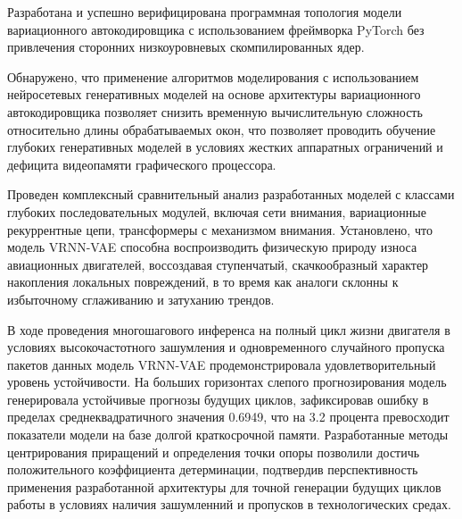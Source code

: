 \documentclass[14pt, a4paper, oneside]{extreport}
\begin{document}
Разработана и успешно верифицирована программная топология модели вариационного автокодировщика с использованием фреймворка PyTorch без привлечения сторонних низкоуровневых скомпилированных ядер. 

Обнаружено, что применение алгоритмов моделирования с использованием нейросетевых генеративных моделей на основе архитектуры вариационного автокодировщика позволяет снизить временную вычислительную сложность относительно длины обрабатываемых окон, что позволяет проводить обучение глубоких генеративных моделей в условиях жестких аппаратных ограничений и дефицита видеопамяти графического процессора.

Проведен комплексный сравнительный анализ разработанных моделей с классами глубоких последовательных модулей, включая сети внимания, вариационные рекуррентные цепи, трансформеры с механизмом внимания. Установлено, что модель VRNN-VAE способна воспроизводить физическую природу износа авиационных двигателей, воссоздавая ступенчатый, скачкообразный характер накопления локальных повреждений, в то время как аналоги склонны к избыточному сглаживанию и затуханию трендов.

В ходе проведения многошагового инференса на полный цикл жизни двигателя в условиях высокочастотного зашумления и одновременного случайного пропуска пакетов данных модель VRNN-VAE продемонстрировала удовлетворительный уровень устойчивости. На больших горизонтах слепого прогнозирования модель генерировала устойчивые прогнозы будущих циклов, зафиксировав ошибку в пределах среднеквадратичного значения 0.6949, что на 3.2 процента превосходит показатели модели на базе долгой краткосрочной памяти. Разработанные методы центрирования приращений и определения точки опоры позволили достичь положительного коэффициента детерминации, подтвердив перспективность применения разработанной архитектуры для точной генерации будущих циклов работы в условиях наличия зашумленний и пропусков в технологических средах.
\end{document}
